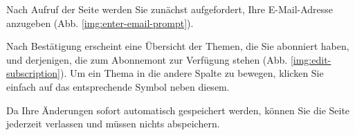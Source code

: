 Nach Aufruf der Seite werden Sie zunächst aufgefordert,
Ihre E-Mail-Adresse anzugeben (Abb. \ref{img:enter-email-prompt}).


Nach Bestätigung erscheint eine Übersicht der Themen,
die Sie abonniert haben,
und derjenigen,
die zum Abonnemont zur Verfügung stehen
(Abb. \ref{img:edit-subscription}).
Um ein Thema in die andere Spalte zu bewegen,
klicken Sie einfach auf das entsprechende Symbol neben diesem.

Da Ihre Änderungen sofort automatisch gespeichert werden,
können Sie die Seite jederzeit verlassen
und müssen nichts abspeichern.

